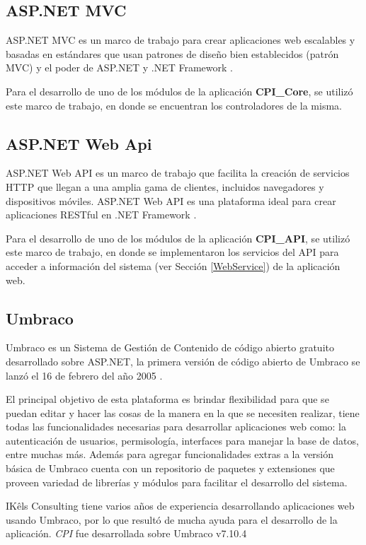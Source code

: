 \subsection{ASP.NET MVC}
ASP.NET MVC es un marco de trabajo para crear aplicaciones web escalables y basadas en estándares que usan patrones de diseño bien establecidos (patrón MVC) y el poder de ASP.NET y .NET Framework \cite{aspmvcMicrosoft}.

Para el desarrollo de uno de los módulos de la aplicación \textbf{CPI\_Core}, se utilizó este marco de trabajo, en donde se encuentran los controladores de la misma.

\subsection{ASP.NET Web Api}
ASP.NET Web API es un marco de trabajo que facilita la creación de servicios HTTP que llegan a una amplia gama de clientes, incluidos navegadores y dispositivos móviles. ASP.NET Web API es una plataforma ideal para crear aplicaciones RESTful en .NET Framework \cite{aspWebAPIMicrosoft}.

Para el desarrollo de uno de los módulos de la aplicación \textbf{CPI\_API}, se utilizó este marco de trabajo, en donde se implementaron los servicios del API para acceder a información del sistema (ver Sección \ref{WebService}) de la aplicación web.

\subsection{Umbraco}
Umbraco es un Sistema de Gestión de Contenido de código abierto gratuito desarrollado sobre ASP.NET, la primera versión de código abierto de Umbraco se lanzó el 16 de febrero del año 2005 \cite{umbraco}.

El principal objetivo de esta plataforma es brindar flexibilidad para que se puedan editar y hacer las cosas de la manera en la que se necesiten realizar, tiene todas las funcionalidades necesarias para desarrollar aplicaciones web como: la autenticación de usuarios, permisología, interfaces para manejar la base de datos, entre muchas más. Además para agregar funcionalidades extras a la versión básica de Umbraco cuenta con un repositorio de paquetes y extensiones que proveen variedad de librerías y módulos para facilitar el desarrollo del sistema. 

IKêls Consulting tiene varios años de experiencia desarrollando aplicaciones web usando Umbraco, por lo que resultó de mucha ayuda para el desarrollo de la aplicación. \textit{CPI} fue desarrollada sobre Umbraco v7.10.4


